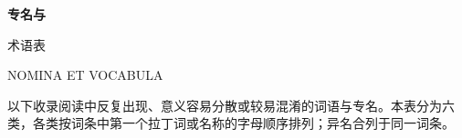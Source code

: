 \clearpage
{}
{}
\thispagestyle{chapterstart}
\begingroup
\vspace*{8mm}
\noindent
\begin{minipage}[t]{0.515\textwidth}
  \vspace{0pt}\RaggedRight
  {\glosslatin\glosscjk\bfseries\fontsize{34}{39}\selectfont\color{black!92}专名与\par 术语表\par}
\end{minipage}\hfill
\begin{minipage}[t]{0.425\textwidth}
  \vspace{1.6mm}\RaggedRight
  {\glosslatin\fontsize{8}{12}\selectfont\color{accent}NOMINA ET VOCABULA\par}
  \vspace{5mm}
  {\glosscjk\fontsize{8.6}{12.4}\selectfont\color{footgray}
  以下收录阅读中反复出现、意义容易分散或较易混淆的词语与专名。本表分为六类，各类按词条中第一个拉丁词或名称的字母顺序排列；异名合列于同一词条。\par}
\end{minipage}\par
\vspace{8mm}
\setlength{\columnsep}{8mm}
\setlength{\columnseprule}{0pt}
\setlength{\multicolsep}{0pt}
\newif\ifglossnewsection
\glossnewsectionfalse
\newcommand{\glosssectiontitle}{}
\newcommand{\readerglosssection}[2]{%
  \par\addvspace{5.5mm}%
  \def\glosssectiontitle{#2}\glossnewsectiontrue%
}
\newcommand{\readerglossentry}[3]{%
  \par\addvspace{2.5mm}\noindent%
  \begin{minipage}[t]{\linewidth}%
    \vspace{0pt}\RaggedRight%
    \ifglossnewsection%
      {\glosslatin\glosscjk\bfseries\fontsize{14}{18}\selectfont\color{black!92}\glosssectiontitle\par}%
      \vspace{3.5mm}%
    \fi%
    {\glosslatin\glosscjk\bfseries\fontsize{9.8}{13.4}\selectfont\color{black!92}#1}%
    \nobreak\hspace{0.6em}%
    {\glosscjk\mdseries\fontsize{9}{13.4}\selectfont\color{accent}#2\par}%
    \vspace{0.65mm}%
    {\normalfont\rmfamily\fontsize{9.4}{13.4}\selectfont\color{black!92}#3\par}%
  \end{minipage}\par%
  \glossnewsectionfalse%
}
